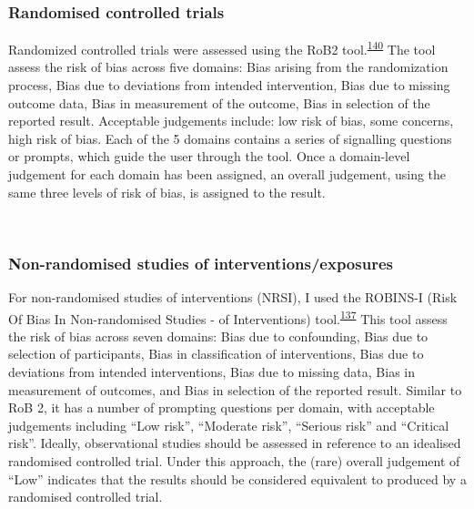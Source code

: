 \documentclass[a4paper, twoside]{templates/ociamthesis}
\begin{document}
\hypertarget{randomised-controlled-trials-1}{%
\subsubsection{Randomised controlled trials}\label{randomised-controlled-trials-1}}

Randomized controlled trials were assessed using the RoB2 tool.\textsuperscript{\protect\hyperlink{ref-sterne2019}{140}} The tool assess the risk of bias across five domains: Bias arising from the randomization process, Bias due to deviations from intended intervention, Bias due to missing outcome data, Bias in measurement of the outcome, Bias in selection of the reported result. Acceptable judgements include: low risk of bias, some concerns, high risk of bias. Each of the 5 domains contains a series of signalling questions or prompts, which guide the user through the tool. Once a domain-level judgement for each domain has been assigned, an overall judgement, using the same three levels of risk of bias, is assigned to the result.

~

\hypertarget{non-randomised-studies-of-interventionsexposures}{%
\subsubsection{Non-randomised studies of interventions/exposures}\label{non-randomised-studies-of-interventionsexposures}}

For non-randomised studies of interventions (NRSI), I used the ROBINS-I (Risk Of Bias In Non-randomised Studies - of Interventions) tool.\textsuperscript{\protect\hyperlink{ref-sterne2016}{137}} This tool assess the risk of bias across seven domains: Bias due to confounding, Bias due to selection of participants, Bias in classification of interventions, Bias due to deviations from intended interventions, Bias due to missing data, Bias in measurement of outcomes, and Bias in selection of the reported result. Similar to RoB 2, it has a number of prompting questions per domain, with acceptable judgements including ``Low risk'', ``Moderate risk'', ``Serious risk'' and ``Critical risk''. Ideally, observational studies should be assessed in reference to an idealised randomised controlled trial. Under this approach, the (rare) overall judgement of ``Low'' indicates that the results should be considered equivalent to produced by a randomised controlled trial.
\end{document}
